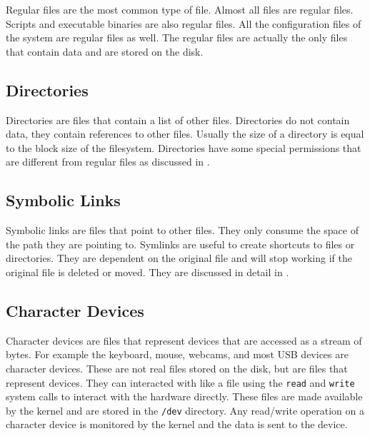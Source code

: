 Regular files are the most common type of file.
Almost all files are regular files.
Scripts and executable binaries are also regular files.
All the configuration files of the system are regular files as well.
The regular files are actually the only files that contain data and are stored on the disk.

\subsection{Directories}

Directories are files that contain a list of other files.
Directories do not contain data, they contain references to other files.
Usually the size of a directory is equal to the block size of the filesystem.
Directories have some special permissions that are different from regular files as discussed in .

\subsection{Symbolic Links}

Symbolic links are files that point to other files.
They only consume the space of the path they are pointing to.
Symlinks
are useful to create shortcuts to files or directories.
They are dependent on the original file and will stop working if the original file is deleted or moved.
They are discussed in detail in .


\subsection{Character Devices}

Character devices are files that represent devices that are accessed as a stream of bytes.
For example the keyboard, mouse, webcams, and most USB devices are character devices.
These are not real files stored on the disk, but are files that represent devices.
They can interacted with like a file using the \lstinline|read| and \lstinline|write| system calls to interact with the hardware directly.
These files are made available by the kernel and are stored in the \lstinline|/dev| directory.
Any read/write operation on a character device is monitored by the kernel and the data is sent to the device.

